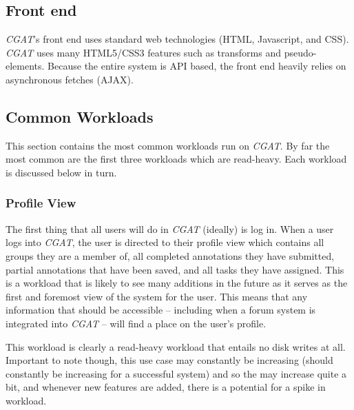 \documentclass[12pt]{ucthesis}
\begin{document}
\subsection{Front end}
\textit{CGAT}'s front end uses standard web technologies (HTML, Javascript, and CSS).
\textit{CGAT} uses many HTML5/CSS3 features such as transforms and pseudo-elements.
Because the entire system is API based, the front end heavily relies on asynchronous fetches (AJAX).

\subsection{Common Workloads}
\label{common-work}
This section contains the most common workloads run on \textit{CGAT}. By far the most common
are the first three workloads which are read-heavy. Each workload is discussed below in turn.

\subsubsection{Profile View}
The first thing that all users will do in \textit{CGAT} (ideally) is log in.
When a user logs into \textit{CGAT}, the user is directed to their profile
view which contains all groups they are a member of, all completed
annotations they have submitted, partial annotations that have been saved, and
all tasks they have assigned. This is a workload that is likely to see many
additions in the future as it serves as the first and foremost view of the
system for the user. This means that any information that should be accessible
-- including when a forum system is integrated into \textit{CGAT} -- will find
a place on the user's profile.

This workload is clearly a read-heavy workload that entails no disk writes at
all. Important to note though, this use case may constantly be increasing
(should constantly be increasing for a successful system) and so the may increase quite a bit, and whenever new features are added,
there is a potential for a spike in workload.
\end{document}
